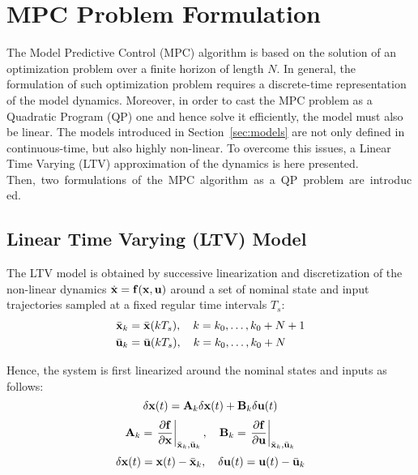 \documentclass[../main.tex]{subfiles}
\begin{document}
\section{MPC Problem Formulation}\label{sec:mpc}

The Model Predictive Control (MPC) algorithm is based on the solution of an
optimization problem over a finite horizon of length $N$. In general, the formulation of such
optimization problem requires a discrete-time representation of the model
dynamics. Moreover, in order to cast the MPC problem as a Quadratic Program
(QP) one and hence solve it efficiently, the model must also be linear.
The models introduced in Section~\ref{sec:models} are not only defined in
continuous-time, but also highly non-linear. To overcome this issues, a Linear
Time Varying (LTV) approximation of the dynamics is here presented. \mbox{Then, two
formulations of the MPC algorithm as a QP problem are introduced.}

\subsection{Linear Time Varying (LTV) Model}

The LTV model is obtained by successive linearization and discretization of the
non-linear dynamics $\dot{\mathbf{x}} = \mathbf{f}(\mathbf{x}, \mathbf{u})$ around a set of nominal state and input trajectories sampled
at a fixed regular time intervals $T_s$:
\begin{equation*}
	\begin{aligned}
		\bar{\mathbf{x}}_k &= \bar{\mathbf{x}}(k T_s), \quad k = k_0, \ldots, k_0 + N + 1\\
		\bar{\mathbf{u}}_k &= \bar{\mathbf{u}}(k T_s), \quad k = k_0, \ldots, k_0 + N
	\end{aligned}
\end{equation*}

Hence, the system is first linearized around the nominal states and inputs as
follows:
\begin{equation*}
	\delta \mathbf{x}(t) = \mathbf{A}_k \delta \mathbf{x}(t) + \mathbf{B}_k \delta
	\mathbf{u}(t)
\end{equation*}
\begin{equation}\label{eq:linearization}
	\mathbf{A}_k = \left. \frac{\partial \mathbf{f}}{\partial \mathbf{x}}
		\right|_{\bar{\mathbf{x}}_k, \bar{\mathbf{u}}_k}, \quad
		\mathbf{B}_k = \left. \frac{\partial \mathbf{f}}{\partial \mathbf{u}}
			\right|_{\bar{\mathbf{x}}_k, \bar{\mathbf{u}}_k}
\end{equation}
\begin{equation*}
	\delta \mathbf{x}(t) = \mathbf{x}(t) - \bar{\mathbf{x}}_k, \quad
	\delta \mathbf{u}(t) = \mathbf{u}(t) - \bar{\mathbf{u}}_k
\end{equation*}
\end{document}
